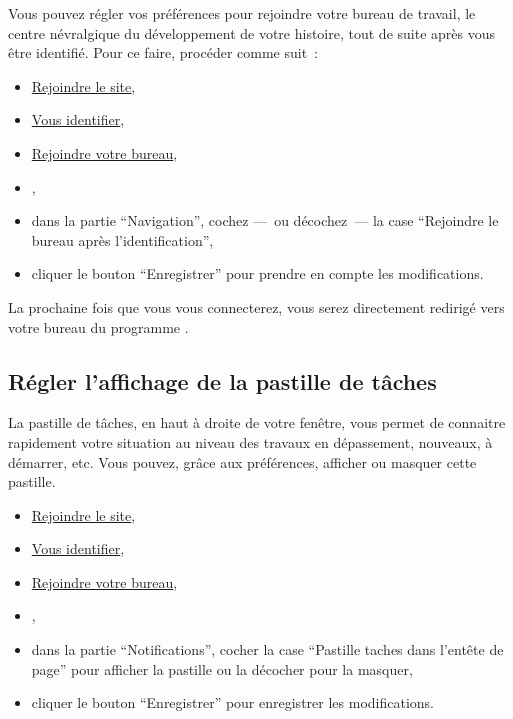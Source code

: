 Vous pouvez régler vos préférences pour rejoindre votre bureau de travail, le centre névralgique du développement de votre histoire, tout de suite après vous être identifié. Pour ce faire, procéder comme suit~{}:

\begin{itemize}
\item \hyperlink{rejoindre-site}{Rejoindre le site},
\item \hyperlink{vous-identifier}{Vous identifier},
\item \hyperlink{rejoindre-bureau}{Rejoindre votre bureau},
\item {},
\item dans la partie \enquote{Navigation}, cochez —~{}ou décochez~{}— la case \enquote{Rejoindre le bureau après l'identification},
\item cliquer le bouton \enquote{Enregistrer} pour prendre en compte les modifications.
\end{itemize}

La prochaine fois que vous vous connecterez, vous serez directement redirigé vers votre bureau du programme \unan{}.

\subsection{Régler l'affichage de la pastille de tâches}\hypertarget{regler-pastille-taches}{}\label{regler-pastille-taches}

La pastille de tâches, en haut à droite de votre fenêtre, vous permet de connaitre rapidement votre situation au niveau des travaux en dépassement, nouveaux, à démarrer, etc. Vous pouvez, grâce aux préférences, afficher ou masquer cette pastille.

\begin{itemize}
\item \hyperlink{rejoindre-site}{Rejoindre le site},
\item \hyperlink{vous-identifier}{Vous identifier},
\item \hyperlink{rejoindre-bureau}{Rejoindre votre bureau},
\item {},
\item dans la partie \enquote{Notifications}, cocher la case \enquote{Pastille taches dans l'entête de page} pour afficher la pastille ou la décocher pour la masquer,
\item cliquer le bouton \enquote{Enregistrer} pour enregistrer les modifications.
\end{itemize}

